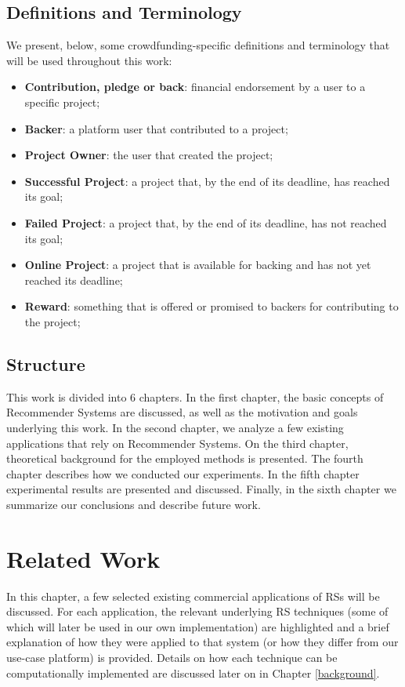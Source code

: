 \documentclass[cic,tc,english]{iiufrgs}
\begin{document}
\section{Definitions and Terminology} \label{terminology}

We present, below, some crowdfunding-specific definitions and terminology that will be used throughout this work:
\begin{itemize}
\item \textbf{Contribution, pledge or back}: financial endorsement by a user to a specific project;
\item \textbf{Backer}: a platform user that contributed to a project;
\item \textbf{Project Owner}: the user that created the project;
\item \textbf{Successful Project}: a project that, by the end of its deadline, has reached its goal;
\item \textbf{Failed Project}: a project that, by the end of its deadline, has not reached its goal;
\item \textbf{Online Project}: a project that is available for backing and has not yet reached its deadline;
\item \textbf{Reward}: something that is offered or promised to backers for contributing to the project;
\end{itemize}

\section{Structure}

This work is divided into 6 chapters. In the first chapter, the basic concepts of Recommender Systems are discussed, as well as the motivation and goals underlying this work. In the second chapter, we analyze a few existing applications that rely on Recommender Systems. On the third chapter, theoretical background for the employed methods is presented. The fourth chapter describes how we conducted our experiments. In the fifth chapter experimental results are presented and discussed. Finally, in the sixth chapter we summarize our conclusions and describe future work.

\chapter{Related Work} \label{related-work}

In this chapter, a few selected existing commercial applications of RSs will be discussed. For each application, the relevant underlying RS techniques (some of which will later be used in our own implementation) are highlighted and a brief explanation of how they were applied to that system (or how they differ from our use-case platform) is provided. Details on how each technique can be computationally implemented are discussed later on in Chapter \ref{background}.
\end{document}
